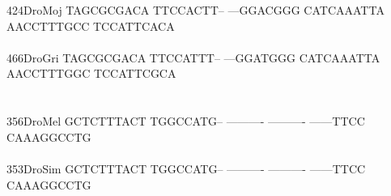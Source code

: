 \documentclass[11pt,twoside,reqno,a4paper]{article}
\begin{document}
{424\hspace*{1\charwidth}DroMoj	TAGCGCGACA	TTCCACTT--	---GGACGGG	CATCAAATTA	AACCTTTGCC	TCCATTCACA	\\
\hspace*{4\charwidth}\hspace*{7\charwidth}\hspace*{1\charwidth}\hspace*{1\charwidth}\hspace*{1\charwidth}\hspace*{1\charwidth}\hspace*{1\charwidth}\hspace*{1\charwidth}\\
466\hspace*{1\charwidth}DroGri	TAGCGCGACA	TTCCATTT--	---GGATGGG	CATCAAATTA	AACCTTTGGC	TCCATTCGCA	\\
\hspace*{4\charwidth}\hspace*{7\charwidth}\hspace*{1\charwidth}\hspace*{1\charwidth}\hspace*{1\charwidth}\hspace*{1\charwidth}\hspace*{1\charwidth}\hspace*{1\charwidth}\\
\\
356\hspace*{1\charwidth}DroMel	GCTCTTTACT	TGGCCATG--	----------	----------	------TTCC	CAAAGGCCTG	\\
\hspace*{4\charwidth}\hspace*{7\charwidth}\hspace*{1\charwidth}\hspace*{1\charwidth}\hspace*{1\charwidth}\hspace*{1\charwidth}\hspace*{1\charwidth}\hspace*{1\charwidth}\\
353\hspace*{1\charwidth}DroSim	GCTCTTTACT	TGGCCATG--	----------	----------	------TTCC	CAAAGGCCTG	\\
\hspace*{4\charwidth}\hspace*{7\charwidth}\hspace*{1\charwidth}\hspace*{1\charwidth}\hspace*{1\charwidth}\hspace*{1\charwidth}\hspace*{1\charwidth}\hspace*{1\charwidth}\\
}
\end{document}
